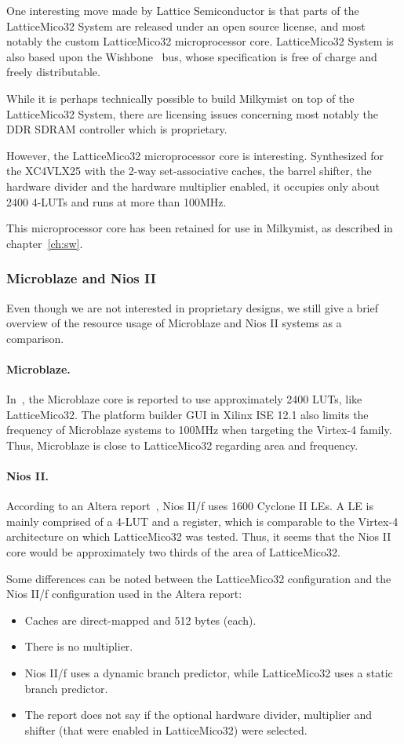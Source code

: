 \documentclass[a4paper,11pt]{kthesis}
\begin{document}
One interesting move made by Lattice Semiconductor is that parts of the LatticeMico32 System are released under an open source license, and most notably the custom LatticeMico32 microprocessor core. LatticeMico32 System is also based upon the Wishbone~\cite{wishbone} bus, whose specification is free of charge and freely distributable.

While it is perhaps technically possible to build Milkymist on top of the LatticeMico32 System, there are licensing issues concerning most notably the DDR SDRAM controller which is proprietary.

However, the LatticeMico32 microprocessor core is interesting. Synthesized for the XC4VLX25 with the 2-way set-associative caches, the barrel shifter, the hardware divider and the hardware multiplier enabled, it occupies only about 2400 4-LUTs and runs at more than 100MHz.

This microprocessor core has been retained for use in Milkymist, as described in chapter~\ref{ch:sw}.

\subsubsection{Microblaze and Nios II}
Even though we are not interested in proprietary designs, we still give a brief overview of the resource usage of Microblaze and Nios II systems as a comparison.

\paragraph{Microblaze.} In~\cite{softcorecomp}, the Microblaze core is reported to use approximately 2400 LUTs, like LatticeMico32. The platform builder GUI in Xilinx ISE 12.1 also limits the frequency of Microblaze systems to 100MHz when targeting the Virtex-4 family. Thus, Microblaze is close to LatticeMico32 regarding area and frequency.

\paragraph{Nios II.} According to an Altera report~\cite{niosbench}, Nios II/f uses 1600 Cyclone II LEs. A LE is mainly comprised of a 4-LUT and a register, which is comparable to the Virtex-4 architecture on which LatticeMico32 was tested. Thus, it seems that the Nios II core would be approximately two thirds of the area of LatticeMico32.

Some differences can be noted between the LatticeMico32 configuration and the Nios II/f configuration used in the Altera report:
\begin{itemize}
\item Caches are direct-mapped and 512 bytes (each).
\item There is no multiplier.
\item Nios II/f uses a dynamic branch predictor, while LatticeMico32 uses a static branch predictor.
\item The report does not say if the optional hardware divider, multiplier and shifter (that were enabled in LatticeMico32) were selected.
\end{itemize}
\end{document}
